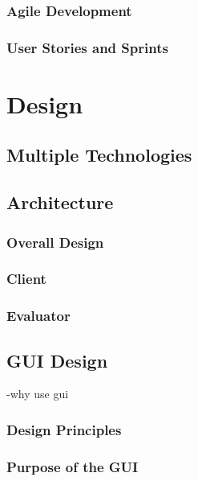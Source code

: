 \documentclass{l4proj}
\begin{document}
\subsection{Agile Development}

\subsection{User Stories and Sprints}



\chapter{Design}

\section{Multiple Technologies}



\section{Architecture}

\subsection{Overall Design}


\subsection{Client}


\subsection{Evaluator}


\section{GUI Design}
-why use gui
\subsection{Design Principles}

\subsection{Purpose of the GUI}
\end{document}

